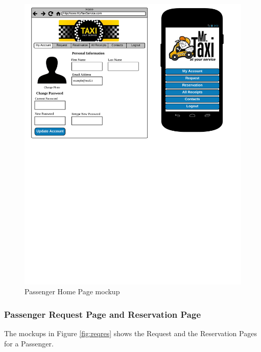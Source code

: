 \begin{figure}[htbp]
\centering
\includegraphics[width=\textwidth]{cpt/img/PassHome}
\caption{Passenger Home Page mockup}
\label{fig:passhome}
\end{figure}

\subsubsection{Passenger Request Page and Reservation Page}
The mockups in Figure \ref{fig:reqres} shows the Request and the Reservation Pages for a Passenger.

